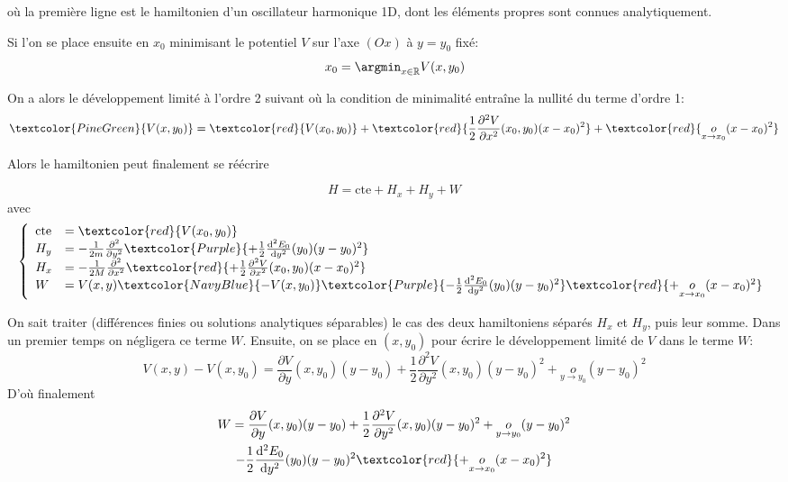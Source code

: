 où la première ligne est le hamiltonien d'un oscillateur harmonique 1D, dont les éléments propres sont connues analytiquement.

Si l'on se place ensuite en $x_0$ minimisant le potentiel $V$ sur l'axe $(Ox)$ à $y=y_0$ fixé:
\begin{equation}
    x_0 = \argmin_{x\in\mathbb{R}} V(x,y_0)
\end{equation}

On a alors le développement limité à l'ordre 2 suivant où la condition de minimalité entraîne la nullité du terme d'ordre 1:
\begin{equation}
    \textcolor{PineGreen}{V(x,y_0)} = \textcolor{red}{V(x_0,y_0)} + \textcolor{red}{\frac{1}{2}\frac{\partial^2 V}{\partial x^2}(x_0,y_0) (x-x_0)^2} +  \textcolor{red}{\underset{x\rightarrow x_0}{o} (x-x_0)^2}
\end{equation}

Alors le hamiltonien peut finalement se réécrire

\begin{equation}
        H = \text{cte} + H_x + H_y + W
\end{equation}
avec
\begin{equation}
       \left\{  \begin{array}{ll}
        \text{cte} &= \textcolor{red}{V(x_0,y_0)} \\
        H_y &= - \frac{1}{2m} \frac{\partial^2}{\partial y^2} \textcolor{Purple}{+ \frac{1}{2} \frac{\mathrm{d}^2 E_0}{\mathrm{d}y^2}(y_0)(y-y_0)^2} \\
        H_x &= - \frac{1}{2M} \frac{\partial^2}{\partial x^2} \textcolor{red}{+ \frac{1}{2}\frac{\partial^2 V}{\partial x^2}(x_0,y_0) (x-x_0)^2} \\
        W &=  V(x,y) \textcolor{NavyBlue}{- V(x,y_0)} \textcolor{Purple}{- \frac{1}{2} \frac{\mathrm{d}^2 E_0}{\mathrm{d}y^2}(y_0)(y-y_0)^2}   \textcolor{red}{+ \underset{x\rightarrow x_0}{o} (x-x_0)^2}
    \end{array}\right.
\end{equation}

On sait traiter (différences finies ou solutions analytiques séparables) le cas des deux hamiltoniens séparés $H_x$ et $H_y$, puis leur somme. Dans un premier temps on négligera ce terme $W$. Ensuite, on se place en $(x,y_0)$ pour écrire le développement limité de $V$ dans le terme $W$:
\begin{equation}
    V(x,y) - V(x,y_0) = \frac{\partial V}{\partial y}(x,y_0)(y-y_0) + \frac{1}{2}\frac{\partial^2V}{\partial y^2}(x,y_0)(y-y_0)^2 + \underset{y\rightarrow y_0}{o} (y-y_0)^2
\end{equation}
D'où finalement
\begin{multline}
    W = \frac{\partial V}{\partial y}(x,y_0)(y-y_0) + \frac{1}{2}\frac{\partial^2V}{\partial y^2}(x,y_0)(y-y_0)^2 + \underset{y\rightarrow y_0}{o} (y-y_0)^2 \\ - \frac{1}{2} \frac{\mathrm{d}^2 E_0}{\mathrm{d}y^2}(y_0)(y-y_0)^2   \textcolor{red}{+ \underset{x\rightarrow x_0}{o} (x-x_0)^2}
\end{multline}




